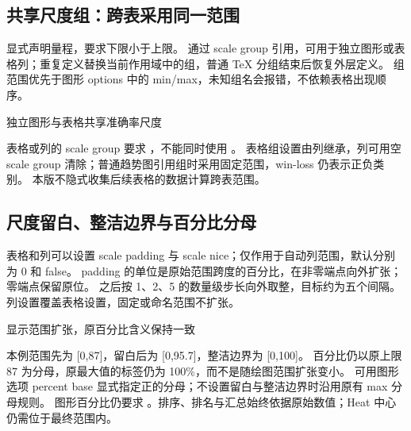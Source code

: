 \subsection{共享尺度组：跨表采用同一范围}
 显式声明量程，要求下限小于上限。
通过 scale group 引用，可用于独立图形或表格列；重复定义替换当前作用域中的组，普通 TeX 分组结束后恢复外层定义。
组范围优先于图形 options 中的 min/max，未知组名会报错，不依赖表格出现顺序。
\begin{example}[text and listing,sidebyside=false]{独立图形与表格共享准确率尺度}

\begin{center}
\begin{gradtable}[align=c,header align=c,style=academic,theme=violet,width=\linewidth]
\end{gradtable}
\end{center}
\end{example}
表格或列的 scale group 要求 ，不能同时使用 。
表格组设置由列继承，列可用空 scale group 清除；普通趋势图引用组时采用固定范围，win-loss 仍表示正负类别。
本版不隐式收集后续表格的数据计算跨表范围。
\subsection{尺度留白、整洁边界与百分比分母}
表格和列可以设置 scale padding 与 scale nice；仅作用于自动列范围，默认分别为 0 和 false。
padding 的单位是原始范围跨度的百分比，在非零端点向外扩张；零端点保留原位。
之后按 1、2、5 的数量级步长向外取整，目标约为五个间隔。列设置覆盖表格设置，固定或命名范围不扩张。
\begin{example}[text and listing,sidebyside=false]{显示范围扩张，原百分比含义保持一致}
\begin{center}
\begin{gradtable}[align=c,header align=c,style=compact,theme=forest,width=\linewidth,
  scale=column,scale padding=10,scale nice=true]
\end{gradtable}
\end{center}
\end{example}
本例范围先为 [0,87]，留白后为 [0,95.7]，整洁边界为 [0,100]。
百分比仍以原上限 87 为分母，原最大值的标签仍为 100\%，而不是随绘图范围扩张变小。
可用图形选项 percent base 显式指定正的分母；不设置留白与整洁边界时沿用原有 max 分母规则。
图形百分比仍要求 。排序、排名与汇总始终依据原始数值；Heat 中心仍需位于最终范围内。
